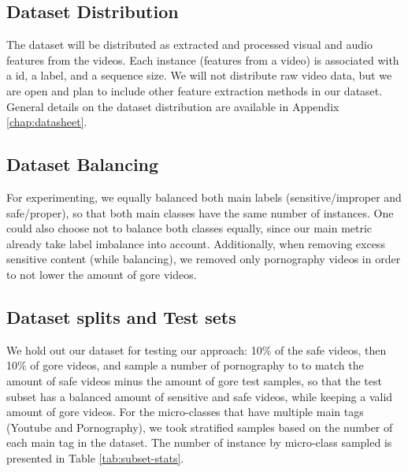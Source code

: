 \subsection{Dataset Distribution}\label{sec:distribution}

The dataset will be distributed as extracted and processed visual and audio features from the videos. Each instance (features from a video) is associated with a id, a label, and a sequence size. We will not distribute raw video data, but we are open and plan to include other feature extraction methods in our dataset. General details on the dataset distribution are available in Appendix \ref{chap:datasheet}.



\subsection{Dataset Balancing}\label{sec:balancing}

For experimenting, we equally balanced both main labels (sensitive/improper and safe/proper), so that both main classes have the same number of instances. One could also choose not to balance both classes equally, since our main metric already take label imbalance into account.
Additionally, when removing excess sensitive content (while balancing), we removed only pornography videos in order to not lower the amount of gore videos.


\subsection{Dataset splits and Test sets}\label{sec:testsets}

We hold out our dataset for testing  our approach: 10\% of the safe videos, then 10\% of gore videos, and sample a number of pornography to to match the amount of safe videos minus the amount of gore test samples, so that the test subset has a balanced amount of sensitive and safe videos, while keeping a valid amount of gore videos. For the micro-classes that have multiple main tags (Youtube and Pornography), we took stratified samples based on the number of each main tag in the dataset. The number of instance by micro-class sampled is presented in Table \ref{tab:subset-stats}.

